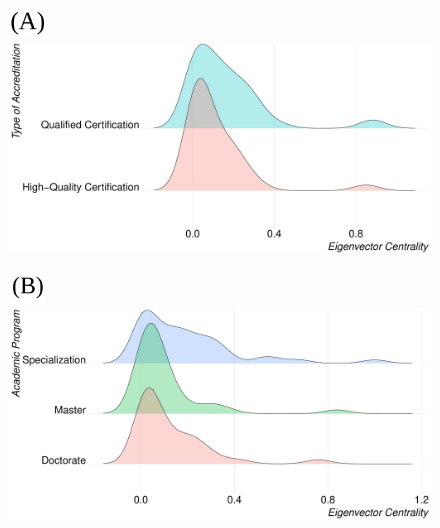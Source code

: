 \documentclass{article}
\begin{document}
\begin{figure}[htbp]
  \centering
  \begin{minipage}[t]{.45\textwidth}
\includegraphics[width=1cm]{(A).png}    \includegraphics[scale=.14]{A1.pdf}
    \label{fig:figure1}
  \end{minipage}
  \hfill
  \begin{minipage}[t]{.45\textwidth}
\includegraphics[width=1cm]{(B).png}    \includegraphics[scale=.14]{A2.pdf}
    \label{fig:figure2}
  \end{minipage}
  
  \vspace{0.5cm}
  

\end{figure}
\end{document}
